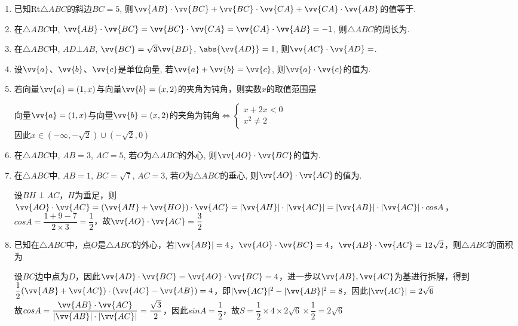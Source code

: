 \begin{enumerate}
\item 已知Rt$\triangle{ABC}$的斜边$BC=5$, 则$\vv{AB}\cdot\vv{BC}+\vv{BC}\cdot\vv{CA}+\vv{CA}\cdot\vv{AB}$的值等于. 


\item 在$\triangle{ABC}$中, $\vv{AB}\cdot\vv{BC}=\vv{BC}\cdot\vv{CA}=\vv{CA}\cdot\vv{AB}=-1$, 则$\triangle{ABC}$的周长为. 


\item 在$\triangle{ABC}$中, $AD\bot AB$, $\vv{BC}=\sqrt{3}\vv{BD}$, $\abs{\vv{AD}}=1$, 则$\vv{AC}\cdot\vv{AD}=$. 

\item 设$\vv{a}$、$\vv{b}$、$\vv{c}$是单位向量, 若$\vv{a}+\vv{b}=\vv{c}$, 则$\vv{a}\cdot\vv{c}$的值为. 

\item 若向量$\vv{a} = (1, x)$与向量$\vv{b} = (x, 2)$的夹角为钝角，则实数$x$的取值范围是
\begin{jieda}
    向量$\vv{a} = (1, x)$与向量$\vv{b} = (x, 2)$的夹角为钝角$ \Longleftrightarrow \left\{\begin{array}{l}
         x + 2x < 0 \\
         x^2 \neq 2
    \end{array}\right.$\\
    因此$x \in (-\infty, -\sqrt{2})\cup(-\sqrt{2}, 0)$
\end{jieda}

\item 在$\triangle{ABC}$中, $AB=3$, $AC=5$, 若$O$为$\triangle{ABC}$的外心, 则$\vv{AO}\cdot\vv{BC}$的值为. 

\item 在$\triangle{ABC}$中, $AB=1$, $BC=\sqrt{7}$, $AC=3$, 若$O$为$\triangle{ABC}$的垂心, 则$\vv{AO}\cdot\vv{AC}$的值为. 
\begin{jieda}
    设$BH \perp AC$，$H$为垂足，则$\vv{AO} \cdot \vv{AC} = (\vv{AH} + \vv{HO}) \cdot \vv{AC} = |\vv{AH}| \cdot |\vv{AC}| = |\vv{AB}| \cdot |\vv{AC}| \cdot cosA$， $cosA = \dfrac{1+9-7}{2\times 3} = \dfrac{1}{2}$，故$\vv{AO}\cdot\vv{AC} = \dfrac{3}{2}$
\end{jieda}

\item 已知在$\triangle{ABC}$中，点$O$是$\triangle{ABC}$的外心，若$|\vv{AB}| = 4$，$\vv{AO} \cdot \vv{BC} = 4$，$\vv{AB} \cdot \vv{AC} = 12\sqrt{2}$，则$\triangle{ABC}$的面积为
\begin{jieda}
    设$BC$边中点为$D$，因此$\vv{AD} \cdot \vv{BC} = \vv{AO} \cdot \vv{BC} = 4$，进一步以$\vv{AB}, \vv{AC}$为基进行拆解，得到$\dfrac{1}{2}(\vv{AB}+\vv{AC}) \cdot (\vv{AC} - \vv{AB}) = 4$，即$|\vv{AC}|^2 - |\vv{AB}|^2 = 8$，因此$|\vv{AC}| = 2\sqrt{6}$\\
    故$cosA = \dfrac{\vv{AB} \cdot \vv{AC}}{|\vv{AB}| \cdot |\vv{AC}|} = \dfrac{\sqrt{3}}{2}$，因此$sinA = \dfrac{1}{2}$，故$S = \dfrac{1}{2} \times 4 \times 2\sqrt{6} \times \dfrac{1}{2} = 2\sqrt{6}$
\end{jieda}


\end{enumerate}
